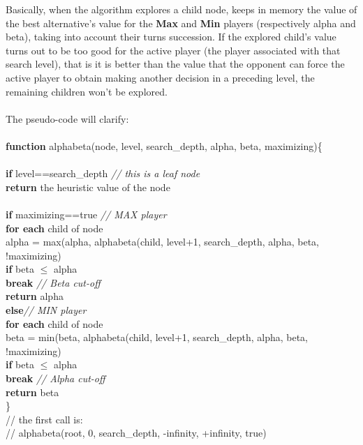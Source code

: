 Basically, when the algorithm explores a child node, keeps in memory the value of the best alternative's value for the \textbf{Max} and \textbf{Min} players (respectively alpha and beta), taking into account their turns succession.
If the explored child's value turns out to be too good for the active player (the player associated with that search level), that is it is better than the value that the opponent can force the active player to obtain making another decision in a preceding level, the remaining children won't be explored.\\
\\
The pseudo-code will clarify:\\
\scriptsize{\\
  \indent\textbf{function} alphabeta(node, level, search\_depth, alpha, beta, maximizing)\{\\
  \indent\\
  \indent\textbf{if} \indent level==search\_depth \indent \indent \textit{// this is a leaf node}\\
  \indent\indent \textbf{return} the heuristic value of the node\\
  \indent\\
  \indent\textbf{if} maximizing==true \indent\indent\indent \textit{// MAX player}\\
  \indent\indent \textbf{for each} child of node\\
  \indent\indent\indent alpha = max(alpha, alphabeta(child, level+1, search\_depth, alpha, beta, !maximizing)\\
  \indent\indent\indent \textbf{if} beta $\leq$ alpha\\
  \indent\indent\indent\indent \textbf{break} \indent\indent\indent \textit{// Beta cut-off}\\
  \indent\indent \textbf{return} alpha\\
  \indent\textbf{else}\indent\indent\indent\indent\indent\indent \textit{// MIN player}\\
  \indent\indent \textbf{for each} child of node\\
  \indent\indent\indent beta = min(beta, alphabeta(child, level+1, search\_depth, alpha, beta, !maximizing)\\
  \indent\indent\indent \textbf{if} beta $\leq$ alpha\\
  \indent\indent\indent\indent \textbf{break} \indent\indent\indent \textit{// Alpha cut-off}\\
  \indent\indent \textbf{return} beta\\
  \indent\}\\
  \indent// the first call is:\\
  \indent// alphabeta(root, 0, search\_depth, -infinity, +infinity, true)
}
